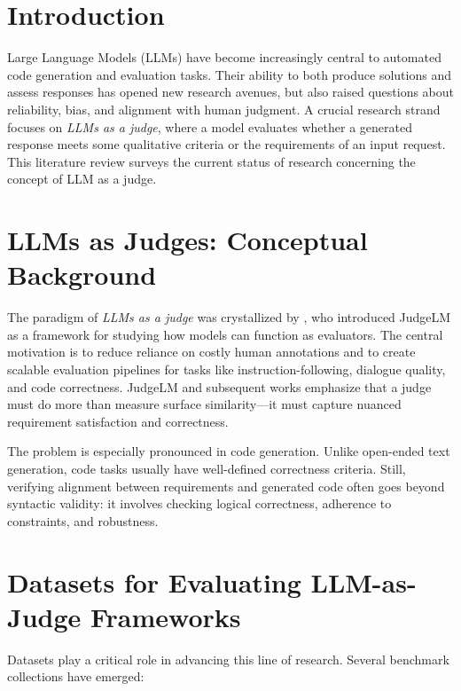 \section{Introduction}
Large Language Models (LLMs) have become increasingly central to automated code generation and evaluation tasks. Their ability to both produce solutions and assess responses has opened new research avenues, but also raised questions about reliability, bias, and alignment with human judgment. A crucial research strand focuses on \textit{LLMs as a judge}, where a model evaluates whether a generated response meets some qualitative criteria or the requirements of an input request. This literature review surveys the current status of research concerning the concept of LLM as a judge. 

\section{LLMs as Judges: Conceptual Background}
The paradigm of \textit{LLMs as a judge} was crystallized by \citet{li2024_llmsasjudges}, who introduced JudgeLM as a framework for studying how models can function as evaluators. The central motivation is to reduce reliance on costly human annotations and to create scalable evaluation pipelines for tasks like instruction-following, dialogue quality, and code correctness. JudgeLM and subsequent works emphasize that a judge must do more than measure surface similarity—it must capture nuanced requirement satisfaction and correctness.

The problem is especially pronounced in code generation. Unlike open-ended text generation, code tasks usually have well-defined correctness criteria. Still, verifying alignment between requirements and generated code often goes beyond syntactic validity: it involves checking logical correctness, adherence to constraints, and robustness.

\section{Datasets for Evaluating LLM-as-Judge Frameworks}
Datasets play a critical role in advancing this line of research. Several benchmark collections have emerged:

